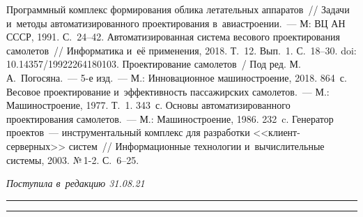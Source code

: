 \begin{multicols}{2}
  
{\small\frenchspacing
 {%
 \begin{thebibliography}{9}
 Программный комплекс 
формирования облика летательных аппаратов~// Задачи и~методы автоматизированного 
проектирования в~авиастроении.~--- М: ВЦ АН СССР, 1991. С.~24--42.
 Автоматизированная система 
весового проектирования самолетов~// Информатика и~её применения, 2018. Т.~12. Вып.~1. 
С.~18--30. doi: 10.14357/19922264180103.
Проектирование самолетов~/ Под ред. М.\,А.~Погосяна.~--- 5-е изд.~--- М.: 
Инновационное машиностроение, 2018. 864~с.
 Весовое проектирование и~эффективность 
пассажирских самолетов.~--- М.: Машиностроение, 1977. Т.~1. 343~с.
 Основы автоматизированного 
проектирования самолетов.~--- М.: Машиностроение, 1986. 232~c.
Генератор проектов~--- инструментальный комплекс для разработки  
<<кли\-ент-сер\-вер\-ных>> сис\-тем~// Информационные технологии и~вычислительные 
системы, 2003. №\,1-2. С.~6--25.
\end{thebibliography}

 }
 }

\end{multicols}


\hfill{\small\textit{Поступила в~редакцию 31.08.21}}

\vspace*{8pt}



\vspace*{2pt}

\hrule

\vspace*{2pt}

\hrule

\vspace*{2pt}

\def\tit{THEORETICAL FOUNDATION OF~FORMATION OF~AIRCRAFT~WEIGHT~APPEARANCE}


\def\titkol{Theoretical foundation of formation of aircraft weight appearance}


